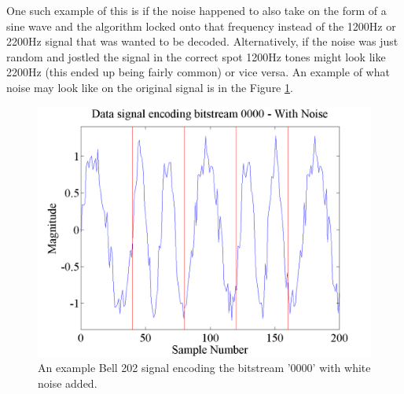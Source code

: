 One such example of this is if the noise happened to also take on the form of a sine wave and the algorithm locked onto that frequency instead of the 1200Hz or 2200Hz signal that was wanted to be decoded. Alternatively, if the noise was just random and jostled the signal in the correct spot 1200Hz tones might look like 2200Hz (this ended up being fairly common) or vice versa. An example of what noise may look like on the original signal is in the Figure \ref{noiseExample}.
\begin{figure}
  \centering
	\includegraphics[width=0.75\linewidth]{images/Datasignalencodingbitstream0000WithNoise.png} 
	\caption{An example Bell 202 signal encoding the bitstream '0000' with white noise added.}
   \label{noiseExample}
\end{figure}

